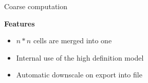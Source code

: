\documentclass[shortpres,usenames,dvipsnames]{beamer}
\begin{document}
\begin{frame}{Coarse computation}
	\begin{multicols}{2}
		\textbf{Features}
		\begin{itemize}
			\item $n*n$ cells are merged into one
			\item Internal use of the high definition model
			\item Automatic downscale on export into file
		\end{itemize}
		
		\vfill
		\columnbreak
		
		

\end{multicols}
\end{frame}
\end{document}
